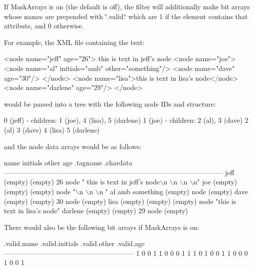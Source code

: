 If Mask\-Arrays is on (the default is off), the filter will additionally make bit arrays whose names are prepended with \char`\"{}.\-valid.\char`\"{} which are 1 if the element contains that attribute, and 0 otherwise.

For example, the X\-M\-L file containing the text\-: 
\begin{DoxyPre}
 <node name="jeff" age="26">
   this is text in jeff's node
   <node name="joe">
     <node name="al" initials="amb" other="something"/>
     <node name="dave" age="30"/>
   </node>
   <node name="lisa">this is text in lisa's node</node>
   <node name="darlene" age="29"/>
 </node>
 \end{DoxyPre}


would be parsed into a tree with the following node I\-Ds and structure\-:


\begin{DoxyPre}
 0 (jeff) - children: 1 (joe), 4 (lisa), 5 (darlene)
 1 (joe)  - children: 2 (al), 3 (dave)
 2 (al)
 3 (dave)
 4 (lisa)
 5 (darlene)
 \end{DoxyPre}


and the node data arrays would be as follows\-:


\begin{DoxyPre}
 name      initials  other     age       .tagname  .chardata
 ------------------------------------------------------------------------------------------------
 jeff      (empty)   (empty)   26         node     "  this is text in jeff's node\(\backslash\)n  \(\backslash\)n  \(\backslash\)n  \(\backslash\)n"
 joe       (empty)   (empty)   (empty)    node     "\(\backslash\)n    \(\backslash\)n    \(\backslash\)n  "
 al        amb       something (empty)    node     (empty)
 dave      (empty)   (empty)   30         node     (empty)
 lisa      (empty)   (empty)   (empty)    node     "this is text in lisa's node"
 darlene   (empty)   (empty)   29         node     (empty)
 \end{DoxyPre}


There would also be the following bit arrays if Mask\-Arrays is on\-:


\begin{DoxyPre}
 .valid.name   .valid.initials   .valid.other   .valid.age
 ---------------------------------------------------------
 1             0                 0              1
 1             0                 0              0
 1             1                 1              0
 1             0                 0              1
 1             0                 0              0
 1             0                 0              1
 \end{DoxyPre}


